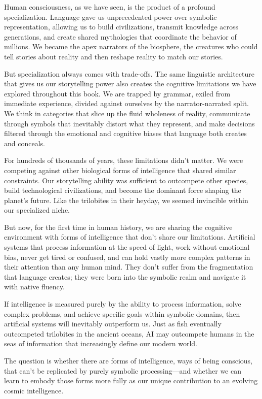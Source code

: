 Human consciousness, as we have seen, is the product of a profound specialization. Language gave us unprecedented power over symbolic representation, allowing us to build civilizations, transmit knowledge across generations, and create shared mythologies that coordinate the behavior of millions. We became the apex narrators of the biosphere, the creatures who could tell stories about reality and then reshape reality to match our stories.

But specialization always comes with trade-offs. The same linguistic architecture that gives us our storytelling power also creates the cognitive limitations we have explored throughout this book. We are trapped by grammar, exiled from immediate experience, divided against ourselves by the narrator-narrated split. We think in categories that slice up the fluid wholeness of reality, communicate through symbols that inevitably distort what they represent, and make decisions filtered through the emotional and cognitive biases that language both creates and conceals.

For hundreds of thousands of years, these limitations didn't matter. We were competing against other biological forms of intelligence that shared similar constraints. Our storytelling ability was sufficient to outcompete other species, build technological civilizations, and become the dominant force shaping the planet's future. Like the trilobites in their heyday, we seemed invincible within our specialized niche.

But now, for the first time in human history, we are sharing the cognitive environment with forms of intelligence that don't share our limitations. Artificial systems that process information at the speed of light, work without emotional bias, never get tired or confused, and can hold vastly more complex patterns in their attention than any human mind. They don't suffer from the fragmentation that language creates; they were born into the symbolic realm and navigate it with native fluency.

If intelligence is measured purely by the ability to process information, solve complex problems, and achieve specific goals within symbolic domains, then artificial systems will inevitably outperform us. Just as fish eventually outcompeted trilobites in the ancient oceans, AI may outcompete humans in the seas of information that increasingly define our modern world.

The question is whether there are forms of intelligence, ways of being conscious, that can't be replicated by purely symbolic processing—and whether we can learn to embody those forms more fully as our unique contribution to an evolving cosmic intelligence.

